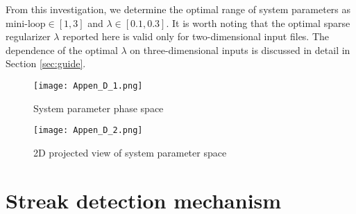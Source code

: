 From this investigation, we determine the optimal range of system parameters as $\text{mini-loop} \in [1, 3]$ and $\lambda \in [0.1, 0.3]$. It is worth noting that the optimal sparse regularizer $\lambda$ reported here is valid only for two-dimensional input files. The dependence of the optimal $\lambda$ on three-dimensional inputs is discussed in detail in Section \ref{sec:guide}.  

\begin{figure}
	\texttt{[image: Appen\_D\_1.png]}
	\centering
	\caption{System parameter phase space}
	\label{fig:system_param}
\end{figure}

\begin{figure}
	\centering
	\texttt{[image: Appen\_D\_2.png]}
	\caption{2D projected view of system parameter space}
	\label{fig:proj_system_param}
\end{figure}

\chapter{Streak detection mechanism}\label{appen:streak_detection}
